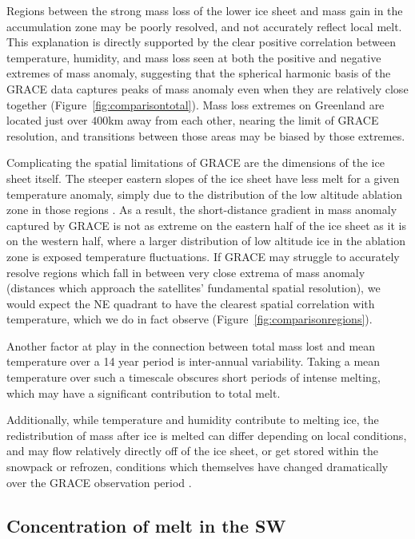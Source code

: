 \documentclass[11pt]{report}
\begin{document}
Regions between the strong mass loss of the lower ice sheet and mass gain in the accumulation zone may be poorly resolved, and not accurately reflect local melt. This explanation is directly supported by the clear positive correlation between temperature, humidity, and mass loss seen at both the positive and negative extremes of mass anomaly, suggesting that the spherical harmonic basis of the GRACE data captures peaks of mass anomaly even when they are relatively close together (Figure~\ref{fig:comparisontotal}). Mass loss extremes on Greenland are located just over $400$km away from each other, nearing the limit of GRACE resolution, and transitions between those areas may be biased by those extremes.

Complicating the spatial limitations of GRACE are the dimensions of the ice sheet itself. The steeper eastern slopes of the ice sheet have less melt for a given temperature anomaly, simply due to the distribution of the low altitude ablation zone in those regions \cite[][]{bevis2019}. As a result, the short-distance gradient in mass anomaly captured by GRACE is not as extreme on the eastern half of the ice sheet as it is on the western half, where a larger distribution of low altitude ice in the ablation zone is exposed temperature fluctuations. If GRACE may struggle to accurately resolve regions which fall in between very close extrema of mass anomaly (distances which approach the satellites' fundamental spatial resolution), we would expect the NE quadrant to have the clearest spatial correlation with temperature, which we do in fact observe (Figure~\ref{fig:comparisonregions}).

Another factor at play in the connection between total mass lost and mean temperature over a 14 year period is inter-annual variability. Taking a mean temperature over such a timescale obscures short periods of intense melting, which may have a significant contribution to total melt.

Additionally, while temperature and humidity contribute to melting ice, the redistribution of mass after ice is melted can differ depending on local conditions, and may flow relatively directly off of the ice sheet, or get stored within the snowpack or refrozen, conditions which themselves have changed dramatically over the GRACE observation period \cite[][]{angelen2014,pena2015}.

\subsection{Concentration of melt in the SW}
\end{document}
